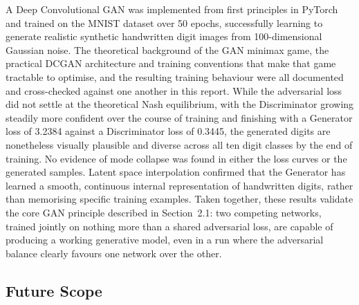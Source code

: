 \documentclass[12pt,a4paper]{article}
\begin{document}
A Deep Convolutional GAN was implemented from first principles in PyTorch and trained on
the MNIST dataset over 50 epochs, successfully learning to generate realistic synthetic
handwritten digit images from 100-dimensional Gaussian noise. The theoretical background
of the GAN minimax game, the practical DCGAN architecture and training conventions that
make that game tractable to optimise, and the resulting training behaviour were all
documented and cross-checked against one another in this report. While the adversarial
loss did not settle at the theoretical Nash equilibrium, with the Discriminator growing
steadily more confident over the course of training and finishing with a Generator loss
of 3.2384 against a Discriminator loss of 0.3445, the generated digits are nonetheless
visually plausible and diverse across all ten digit classes by the end of training. No
evidence of mode collapse was found in either the loss curves or the generated samples.
Latent space interpolation confirmed that the Generator has learned a smooth, continuous
internal representation of handwritten digits, rather than memorising specific training
examples. Taken together, these results validate the core GAN principle described in
Section~2.1: two competing networks, trained jointly on nothing more than a shared
adversarial loss, are capable of producing a working generative model, even in a run
where the adversarial balance clearly favours one network over the other.

\subsection{Future Scope}
\label{sec:future}
\end{document}

